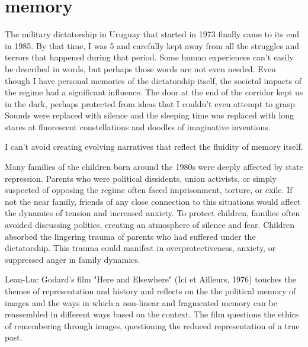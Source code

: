 \chapter*{memory}
\begin{center}
\vspace{2cm}
\begin{flushright}
\large
\end{flushright}
\vspace{2cm}
\end{center}
\normalsize

The military dictatorship in Uruguay that started in 1973 finally came to its end in 1985. By that time, I was 5 and carefully kept away from all the struggles and terrors that happened during that period. Some human experiences can't easily be described in words, but perhaps those words are not even needed. Even though I have personal memories of the dictatorship itself, the societal impacts of the regime had a significant influence. The door at the end of the corridor kept us in the dark, perhaps protected from ideas that I couldn't even attempt to grasp. Sounds were replaced with silence and the sleeping time was replaced with long stares at fluorescent constellations and doodles of imaginative inventions.    

I can't avoid creating evolving narratives that reflect the fluidity of memory itself. 

Many families of the children born around the 1980s were deeply affected by state repression. Parents who were political dissidents, union activists, or simply suspected of opposing the regime often faced imprisonment, torture, or exile. If not the near family, friends of any close connection to this situations would affect the dynamics of tension and increased anxiety. To protect children, families often avoided discussing politics, creating an atmosphere of silence and fear. Children absorbed the lingering trauma of parents who had suffered under the dictatorship. This trauma could manifest in overprotectiveness, anxiety, or suppressed anger in family dynamics.

Lean-Luc Godard’s film "Here and Elsewhere" (Ici et Ailleurs, 1976) touches the themes of representation and history and reflects on the the political memory of images and the ways in which a non-linear and fragmented memory can be reassembled in different ways based on the context. The film questions the ethics of remembering through images, questioning the reduced representation of a true past. 

